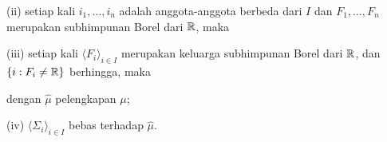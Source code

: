 (ii) setiap kali $i_1,\ldots,i_n$ adalah anggota-anggota berbeda dari $I$
dan $F_1,\ldots,F_n$ merupakan subhimpunan Borel dari $\Bbb R$, maka


(iii) setiap kali $\langle F_i\rangle_{i\in I}$ merupakan keluarga
subhimpunan Borel dari $\Bbb R$, dan $\{i:F_i\ne\Bbb R\}$ berhingga, maka


\noindent dengan $\hat\mu$ pelengkapan $\mu$;

(iv) $\langle\Sigma_i\rangle_{i\in I}$ bebas terhadap $\hat\mu$.

